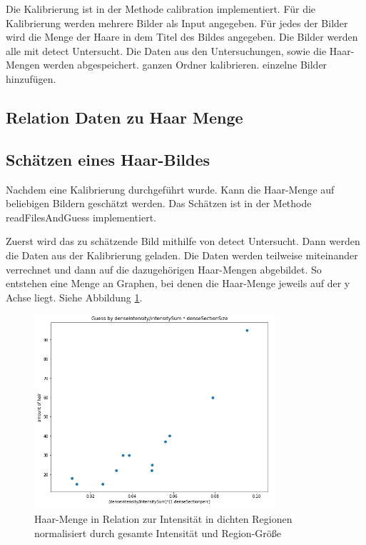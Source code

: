 \documentclass[german,a4paper, 12pt]{llncs}
\begin{document}
Die Kalibrierung ist in der Methode calibration implementiert.
Für die Kalibrierung werden mehrere Bilder als Input angegeben. Für jedes der Bilder wird die Menge der Haare in dem Titel des Bildes angegeben. 
Die Bilder werden alle mit detect Untersucht. Die Daten aus den Untersuchungen, sowie die Haar-Mengen werden abgespeichert.
ganzen Ordner kalibrieren. einzelne Bilder hinzufügen.

\subsection{Relation Daten zu Haar Menge}



\subsection{Schätzen eines Haar-Bildes}

Nachdem eine Kalibrierung durchgeführt wurde. Kann die Haar-Menge auf beliebigen Bildern geschätzt werden.
Das Schätzen ist in der Methode readFilesAndGuess implementiert.

Zuerst wird das zu schätzende Bild mithilfe von detect Untersucht.
Dann werden die Daten aus der Kalibrierung geladen. 
Die Daten werden teilweise miteinander verrechnet und dann auf die dazugehörigen Haar-Mengen abgebildet.
So entstehen eine Menge an Graphen, bei denen die Haar-Menge jeweils auf der y Achse liegt. Siehe Abbildung \ref{fig:mapping}. 

\begin{figure}
	\centering
	\includegraphics[width=0.8\textwidth]{fig64/gh4.PNG}
	\caption[]{Haar-Menge in Relation zur Intensität in dichten Regionen normalisiert durch gesamte Intensität und Region-Größe}
	\label{fig:mapping}
\end{figure}
\end{document}
